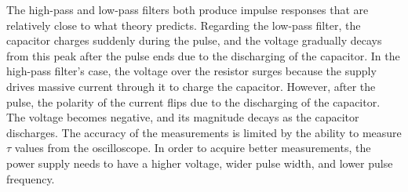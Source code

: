 The high-pass and low-pass filters both produce impulse responses that are relatively close to what theory predicts. Regarding the low-pass filter, the capacitor charges suddenly during the pulse, and the voltage gradually decays from this peak after the pulse ends due to the discharging of the capacitor. In the high-pass filter's case, the voltage over the resistor surges because the supply drives massive current through it to charge the capacitor. However, after the pulse, the polarity of the current flips due to the discharging of the capacitor. The voltage becomes negative, and its magnitude decays as the capacitor discharges. The accuracy of the measurements is limited by the ability to measure $\tau$ values from the oscilloscope. In order to acquire better measurements, the power supply needs to have a higher voltage, wider pulse width, and lower pulse frequency.
